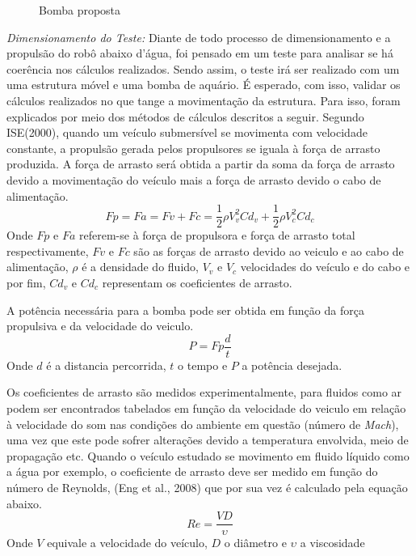 \begin{description}
\begin{figure}[h]
  \caption{ Bomba proposta}
  \label{fig:waterbomb}
\end{figure}
\FloatBarrier
\par
\textit{Dimensionamento do Teste:} Diante de todo processo de dimensionamento
e a propulsão do robô abaixo d’água, foi pensado em um teste para analisar se
há coerência nos cálculos realizados. Sendo assim, o teste irá ser realizado
com um uma estrutura móvel e uma bomba de aquário. É esperado, com isso, validar
os cálculos realizados no que tange a movimentação da estrutura. Para isso,
foram explicados por meio dos métodos de cálculos descritos a seguir. Segundo
ISE(2000), quando um veículo submersível se movimenta com velocidade constante,
a propulsão gerada pelos propulsores se iguala à força de arrasto produzida. A
força de arrasto será obtida a partir da soma da força de arrasto devido a 
movimentação do veículo mais a força de arrasto devido o cabo de alimentação.
\begin{displaymath}
  Fp = Fa = Fv + Fc = \frac{1}{2}\rho V^{2}_{v}Cd_{v} + \frac{1}{2}\rho V^{2}_{c}Cd_{c}
\end{displaymath}
Onde $Fp$ e $Fa$ referem-se à força de propulsora e força de arrasto total
respectivamente, $Fv$ e $Fc$ são as forças de arrasto devido ao veiculo e ao cabo de
alimentação, $\rho$ é a densidade do fluido, $V_{v}$ e $V_{c}$ velocidades do
veículo e do cabo e por fim, $Cd_{v}$ e $Cd_{c}$ representam os coeficientes
de arrasto.
\par
A potência necessária para a bomba pode ser obtida em função da força propulsiva
e da velocidade do veiculo.
\begin{displaymath}
  P = Fp\frac{d}{t}
\end{displaymath}
Onde $d$ é a distancia percorrida, $t$ o tempo e $P$ a potência desejada.
\par
Os coeficientes de arrasto são medidos experimentalmente, para fluidos como
ar podem ser encontrados tabelados em função da velocidade do veiculo em relação
à velocidade do som nas condições do ambiente em questão (número de \textit{Mach}), uma
vez que este pode sofrer alterações devido a temperatura envolvida, meio de
propagação etc. Quando o veículo estudado se movimento em fluido líquido como a
água por exemplo, o coeficiente de arrasto deve ser medido em função do número
de Reynolds, (Eng et al., 2008) que por sua vez é calculado pela equação abaixo.
\begin{displaymath}
  Re = \frac{VD}{\upsilon}
\end{displaymath}
Onde $V$ equivale a velocidade do veículo, $D$ o diâmetro e $\upsilon$ a viscosidade

\end{description}
